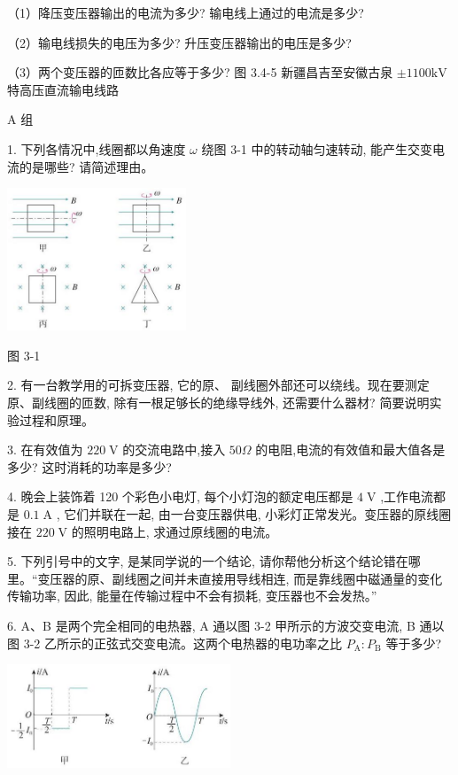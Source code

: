 \documentclass[10pt]{article}
\begin{document}
（1）降压变压器输出的电流为多少? 输电线上通过的电流是多少?

（2）输电线损失的电压为多少? 升压变压器输出的电压是多少?

（3）两个变压器的匝数比各应等于多少? 图 3.4-5 新疆昌吉至安徽古泉 \(\pm {1100}\mathrm{{kV}}\) 特高压直流输电线路

A 组

1. 下列各情况中,线圈都以角速度 \(\omega\) 绕图 3-1 中的转动轴匀速转动, 能产生交变电流的是哪些? 请简述理由。

\begin{center}
\includegraphics[max width=0.4\textwidth]{images/01910e72-c5b7-7ed5-a6d4-fb3a5faefc32_73_431971.jpg}
\end{center}

图 3-1

2. 有一台教学用的可拆变压器, 它的原、 副线圈外部还可以绕线。现在要测定原、副线圈的匝数, 除有一根足够长的绝缘导线外, 还需要什么器材? 简要说明实验过程和原理。

3. 在有效值为 \({220}\mathrm{\;V}\) 的交流电路中,接入 \({50\Omega }\) 的电阻,电流的有效值和最大值各是多少? 这时消耗的功率是多少?

4. 晚会上装饰着 120 个彩色小电灯, 每个小灯泡的额定电压都是 \(4\mathrm{\;V}\) ,工作电流都是 \({0.1}\mathrm{\;A}\) , 它们并联在一起, 由一台变压器供电, 小彩灯正常发光。变压器的原线圈接在 \({220}\mathrm{\;V}\) 的照明电路上, 求通过原线圈的电流。

5. 下列引号中的文字, 是某同学说的一个结论, 请你帮他分析这个结论错在哪里。“变压器的原、副线圈之间并未直接用导线相连, 而是靠线圈中磁通量的变化传输功率, 因此, 能量在传输过程中不会有损耗, 变压器也不会发热。”

6. A、B 是两个完全相同的电热器, A 通以图 3-2 甲所示的方波交变电流, B 通以图 3-2 乙所示的正弦式交变电流。这两个电热器的电功率之比 \({P}_{\mathrm{A}} : {P}_{\mathrm{B}}\) 等于多少?

\begin{center}
\includegraphics[max width=0.5\textwidth]{images/01910e72-c5b7-7ed5-a6d4-fb3a5faefc32_73_386186.jpg}
\end{center}
\end{document}
